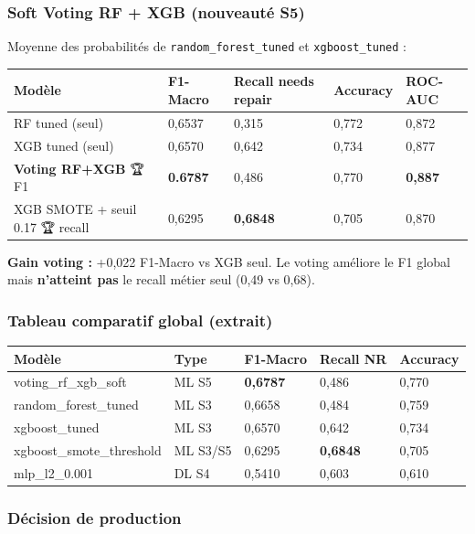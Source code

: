 \documentclass[11pt,a4paper]{report}
\begin{document}
\subsubsection{Soft Voting RF + XGB (nouveauté S5)}



Moyenne des probabilités de \texttt{random\_forest\_tuned} et \texttt{xgboost\_tuned} :



\begin{longtable}{@{}lllll@{}}
\toprule
Modèle & F1-Macro & Recall needs repair & Accuracy & ROC-AUC \\
\midrule
RF tuned (seul) & 0,6537 & 0,315 & 0,772 & 0,872 \\
XGB tuned (seul) & 0,6570 & 0,642 & 0,734 & 0,877 \\
\textbf{Voting RF+XGB} 🏆 F1 & \textbf{0.6787} & 0,486 & 0,770 & \textbf{0,887} \\
XGB SMOTE + seuil 0.17 🏆 recall & 0,6295 & \textbf{0,6848} & 0,705 & 0,870 \\
\bottomrule
\end{longtable}




\textbf{Gain voting :} +0,022 F1-Macro vs XGB seul. Le voting améliore le F1 global mais \textbf{n'atteint pas} le recall métier seul (0,49 vs 0,68).



\subsubsection{Tableau comparatif global (extrait)}



\begin{longtable}{@{}lllll@{}}
\toprule
Modèle & Type & F1-Macro & Recall NR & Accuracy \\
\midrule
voting\_rf\_xgb\_soft & ML S5 & \textbf{0,6787} & 0,486 & 0,770 \\
random\_forest\_tuned & ML S3 & 0,6658 & 0,484 & 0,759 \\
xgboost\_tuned & ML S3 & 0,6570 & 0,642 & 0,734 \\
xgboost\_smote\_threshold & ML S3/S5 & 0,6295 & \textbf{0,6848} & 0,705 \\
mlp\_l2\_0.001 & DL S4 & 0,5410 & 0,603 & 0,610 \\
\bottomrule
\end{longtable}




\subsubsection{Décision de production}
\end{document}

